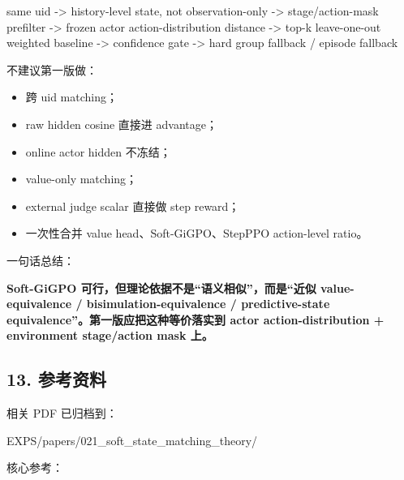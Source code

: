 \documentclass[
  10pt,
]{ctexart}
\newenvironment{Shaded}{}{}
\newcommand{\NormalTok}[1]{#1}
\providecommand{\tightlist}{%
  \setlength{\itemsep}{0pt}\setlength{\parskip}{0pt}}
\begin{document}
\begin{Shaded}
\begin{Highlighting}[]
\NormalTok{same uid}
\NormalTok{  {-}\textgreater{} history{-}level state, not observation{-}only}
\NormalTok{  {-}\textgreater{} stage/action{-}mask prefilter}
\NormalTok{  {-}\textgreater{} frozen actor action{-}distribution distance}
\NormalTok{  {-}\textgreater{} top{-}k leave{-}one{-}out weighted baseline}
\NormalTok{  {-}\textgreater{} confidence gate}
\NormalTok{  {-}\textgreater{} hard group fallback / episode fallback}
\end{Highlighting}
\end{Shaded}

不建议第一版做：

\begin{itemize}
\tightlist
\item
  跨 uid matching；
\item
  raw hidden cosine 直接进 advantage；
\item
  online actor hidden 不冻结；
\item
  value-only matching；
\item
  external judge scalar 直接做 step reward；
\item
  一次性合并 value head、Soft-GiGPO、StepPPO action-level ratio。
\end{itemize}

一句话总结：

\textbf{Soft-GiGPO 可行，但理论依据不是``语义相似''，而是``近似
value-equivalence / bisimulation-equivalence / predictive-state
equivalence''。第一版应把这种等价落实到 actor action-distribution +
environment stage/action mask 上。}

\subsection{13. 参考资料}\label{ux53c2ux8003ux8d44ux6599}

相关 PDF 已归档到：

\begin{Shaded}
\begin{Highlighting}[]
\NormalTok{EXPS/papers/021\_soft\_state\_matching\_theory/}
\end{Highlighting}
\end{Shaded}

核心参考：
\end{document}

